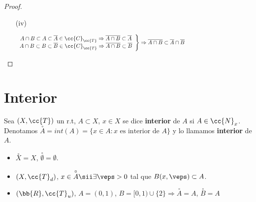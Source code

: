 \begin{prop}
\begin{proof}
\begin{enumerate}
\begin{itemize}
            \end{itemize}
            \item[(iv)]\ \\
            \vspace{-2cm}

            \begin{gather*}
                \left.
                \begin{array}{c}
                    A\cap B \subset A \subset \overline{A}\in \cc{C}_{\cc{T}}\Rightarrow \overline{A\cap B}\subset \overline{A} \\
                    A\cap B \subset B \subset \overline{B}\in \cc{C}_{\cc{T}}\Rightarrow \overline{A\cap B}\subset \overline{B}
                \end{array}\right\} \Rightarrow \overline{A\cap B}\subset \overline{A}\cap \overline{B} \hspace*{5cm}
            \end{gather*}
        \end{enumerate}
    \end{proof}
\end{prop}

\section{Interior}

\begin{definicion}
    Sea $(X, \cc{T})$ un r.t, $A\subset X$, $x\in X$ se dice \textbf{interior} de $A$ si $A\in \cc{N}_x$. Denotamos $\overset{\circ}{A}=int(A)=\{x\in A : x \text{ es interior de }A\}$ y lo llamamos \textbf{interior} de $A$.
    \endsquare 
\end{definicion}

\begin{ejemplo}
    \begin{itemize}
        \item $\overset{\circ}{X} = X$, $\overset{\circ}{\emptyset} = \emptyset$.
        \item $(X, \cc{T}_d)$, $x \in \overset{\circ}{A} \sii \exists \veps >0 $ tal que $B(x, \veps)\subset A$.
        \item $(\bb{R}, \cc{T}_u)$, $A=(0,1)$, $B=[0,1)\cup \{2\} \Rightarrow \overset{\circ}{A}=A$, $\overset{\circ}{B}=A$
    \end{itemize}
\end{ejemplo}

